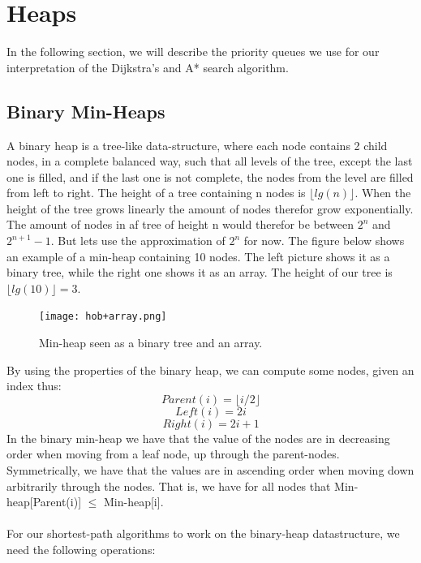 \documentclass[11pt]{article}
\begin{document}
\section{Heaps}
In the following section, we will describe the priority queues we use for our interpretation of the Dijkstra's and A* search algorithm.\\
\subsection{Binary Min-Heaps}
A binary heap is a tree-like data-structure, where each node contains 2 child nodes, in a complete balanced way, such that all levels of the tree, except the last one is filled, and if the last one is not complete, the nodes from the level are filled from left to right. The height of a tree containing n nodes is $\lfloor lg(n) \rfloor$. When the height of the tree grows linearly the amount of nodes therefor grow exponentially. The amount of nodes in af tree of height n would therefor be between $2^n$ and $2^{n+1}-1$. But lets use the approximation of $2^n$ for now. The figure below shows an example of a min-heap containing 10 nodes. The left picture shows it as a binary tree, while the right one shows it as an array. The height of our tree is $\lfloor lg(10) \rfloor = 3$.

\begin{figure}[H]
\centering
\texttt{[image: hob+array.png]}
\caption{Min-heap seen as a binary tree and an array.}
\end{figure}

\noindent By using the properties of the binary heap, we can compute some nodes, given an index thus:\\
$$Parent(i) = \lfloor i/2 \rfloor$$
$$Left(i) = 2i$$
$$Right(i) = 2i+1$$
In the binary min-heap we have that the value of the nodes are in decreasing order when moving from a leaf node, up through the parent-nodes. Symmetrically, we have that the values are in ascending order when moving down arbitrarily through the nodes. That is, we have for all nodes that Min-heap[Parent(i)] $\leq$ Min-heap[i].\\\\
For our shortest-path algorithms to work on the binary-heap datastructure, we need the following operations:
\end{document}

